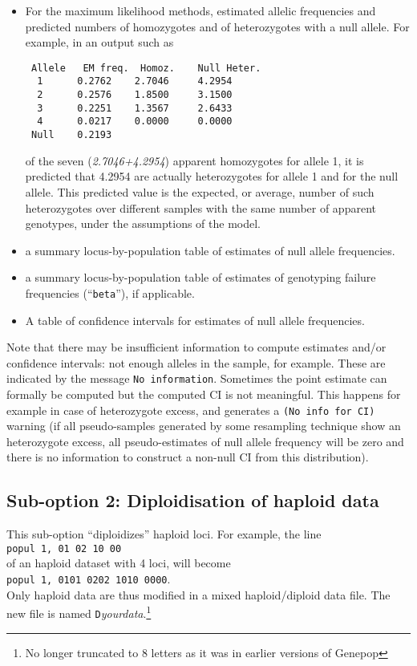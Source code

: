 \documentclass[12pt,]{book}
\let\rmarkdownfootnote\footnote%
\def\footnote{\protect\rmarkdownfootnote}
\begin{document}
\begin{itemize}
\item
  For the maximum likelihood methods, estimated allelic frequencies and
  predicted numbers of homozygotes and of heterozygotes with a null
  allele. For example, in an output such as

\begin{verbatim}
 Allele   EM freq.  Homoz.    Null Heter.
  1      0.2762    2.7046     4.2954
  2      0.2576    1.8500     3.1500
  3      0.2251    1.3567     2.6433
  4      0.0217    0.0000     0.0000
 Null    0.2193
\end{verbatim}

  of the seven (\emph{2.7046+4.2954}) apparent homozygotes for allele 1,
  it is predicted that 4.2954 are actually heterozygotes for allele 1
  and for the null allele. This predicted value is the expected, or
  average, number of such heterozygotes over different samples with the
  same number of apparent genotypes, under the assumptions of the model.
\item
  a summary locus-by-population table of estimates of null allele
  frequencies.
\item
  a summary locus-by-population table of estimates of genotyping failure
  frequencies (``\texttt{beta}''), if applicable.
\item
  A table of confidence intervals for estimates of null allele
  frequencies.
\end{itemize}

Note that there may be insufficient information to compute estimates
and/or confidence intervals: not enough alleles in the sample, for
example. These are indicated by the message \texttt{No\ information}.
Sometimes the point estimate can formally be computed but the computed
CI is not meaningful. This happens for example in case of heterozygote
excess, and generates a \texttt{(No\ info\ for\ CI)} warning (if all
pseudo-samples generated by some resampling technique show an
heterozygote excess, all pseudo-estimates of null allele frequency will
be zero and there is no information to construct a non-null CI from this
distribution).

\subsection{Sub-option 2: Diploidisation of haploid
data}\label{sub-option-2-diploidisation-of-haploid-data}

 This sub-option ``diploidizes'' haploid
loci. For example, the line\\
\texttt{popul\ 1,\ 01\ 02\ 10\ 00}\\
of an haploid dataset with 4 loci, will become\\
\texttt{popul\ 1,\ 0101\ 0202\ 1010\ 0000}.\\
Only haploid data are thus modified in a mixed haploid/diploid data
file. The new file is named \texttt{D}\emph{yourdata}.\footnote{No
  longer truncated to 8 letters as it was in earlier versions of Genepop}
\end{document}
